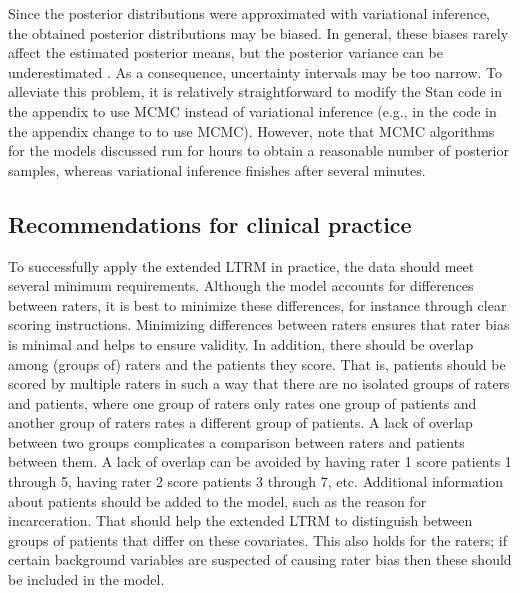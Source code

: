 \documentclass[a4paper,usenames,dvipsnames]{article}
\newcommand{\DON}	[1] 	{}%
\newcommand{\MR}	[1] 	{}%
\begin{document}
Since the posterior distributions were approximated with variational inference, the obtained posterior distributions may be biased. In general, these biases rarely affect the estimated posterior means, but the posterior variance can be underestimated \cite{blei2017variational}. As a consequence, uncertainty intervals may be too narrow. To alleviate this problem, it is relatively straightforward to modify the Stan code in the appendix to use MCMC instead of variational inference (e.g., in the code in the appendix change  to  to use MCMC). However, note that MCMC algorithms for the models discussed run for hours to obtain a reasonable number of posterior samples, whereas variational inference finishes after several minutes.

\subsection*{Recommendations for clinical practice}
To successfully apply the extended LTRM in practice, the data should meet several minimum requirements. Although the model accounts for differences between raters, it is best to minimize these differences, for instance through clear scoring instructions.\MR{why?}\DON{see 2nd sentence} Minimizing differences between raters ensures that rater bias is minimal and helps to ensure validity. In addition, there should be overlap among (groups of) raters and the patients they score. That is, patients should be scored by multiple raters in such a way that there are no isolated groups of raters and patients, where one group of raters only rates one group of patients and another group of raters rates a different group of patients. A lack of overlap between two groups complicates a comparison between raters and patients between them. A lack of overlap can be avoided by having rater 1 score patients 1 through 5, having rater 2 score patients 3 through 7, etc. Additional information about patients should be added to the model, such as the reason for incarceration. That should help the extended LTRM to distinguish between groups of patients that differ on these covariates. This also holds for the raters; if certain background variables are suspected of causing rater bias then these should be included in the model.\MR{ok, I get this part. I'm still very unclear on what the patient background info adds if the goal is to produce factor scores, and not to estimate the effect of patient characteristics on those scores, what is added by including them?}
\end{document}

